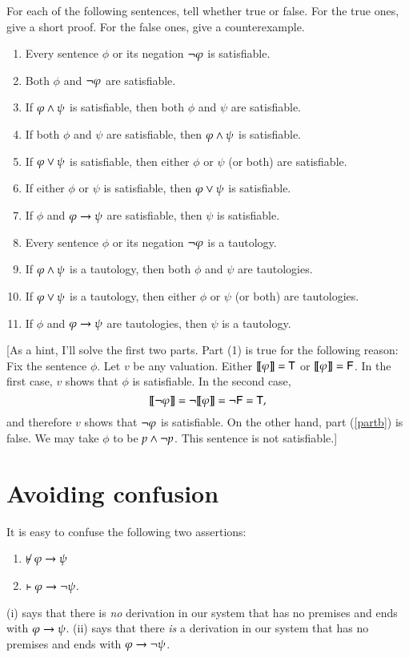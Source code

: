 \documentclass[12pt]{article}
\begin{document}
For each of the following sentences, tell whether true
or false.  For the true ones, give a short proof.
For the false ones, give a counterexample.
\begin{enumerate}
\item Every sentence $\phi$ or its negation $\neg\varphi$ is satisfiable.
\item Both $\phi$ and $\neg\varphi$ are satisfiable. \label{partb}
\item If $\varphi\wedge\psi$ is satisfiable, then both $\phi$ and $\psi$ are satisfiable. 
\item If  both $\phi$ and $\psi$ are satisfiable,
then $\varphi\wedge\psi$ is satisfiable.
\item If $\varphi\vee\psi$ is satisfiable, then either $\phi$ or $\psi$
(or both) are satisfiable. 
\item If  either $\phi$ or $\psi$ is satisfiable,
then $\varphi\vee\psi$ is satisfiable.
\item  If $\phi$ and $\varphi\rightarrow\psi$ are satisfiable, then $\psi$ is satisfiable.
\item Every sentence $\phi$ or its negation $\neg\varphi$ is a tautology.
\item  If $\varphi\wedge\psi$ is a tautology, then both $\phi$ and $\psi$ are tautologies. 
\item If $\varphi\vee\psi$ is a tautology, then either $\phi$ or $\psi$
(or both) are tautologies. 
\item If $\phi$ and $\varphi\rightarrow\psi$ are tautologies, then $\psi$ is a tautology.
\end{enumerate}
[As a hint, I'll solve the first two parts.
Part (1) is true for the following reason: 
Fix the sentence $\phi$.   Let $v$ be any valuation.
Either $[\![\mbox{\em $\varphi$\/}]\!]  = {\sf T}$ or $[\![\mbox{\em $\varphi$\/}]\!] = {\sf F}$.
In the first case, $v$ shows that $\phi$ is satisfiable.
In the second case, 
$$[\![\mbox{\em $\neg\varphi$\/}]\!]  = \neg [\![\mbox{\em $\varphi$\/}]\!]  = \neg {\sf F}  = {\sf T},$$
and therefore $v$ shows that $\neg\varphi$ is satisfiable.
On the other hand, part (\ref{partb}) is false.
We may take $\phi$ to be $p\wedge\neg p$.  This sentence is not satisfiable.]

 


\section{Avoiding confusion}

It is easy to confuse 
the following two assertions:
\begin{enumerate}
\item[(i)]   $\not\proves \phi\iif \psi$ 
\item[(ii)]  $\vdash \varphi\rightarrow \neg\psi$.
\end{enumerate}
(i) says that there is \emph{no} derivation in our system that has no premises and ends with $\varphi\rightarrow \psi$.
(ii) says that there  \emph{is} a  derivation in our system that has no premises and ends with $ \varphi\rightarrow \neg\psi$.
\end{document}
